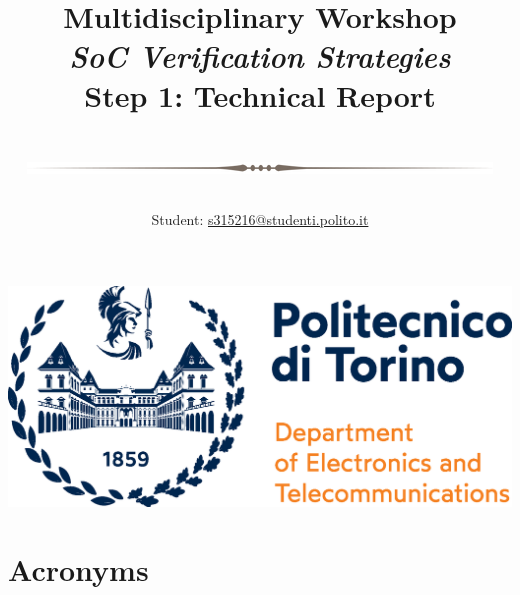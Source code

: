 \documentclass[10pt,  english, makeidx, a4paper, titlepage, oneside]{article}
\title{
    Multidisciplinary Workshop\\
    \textit{SoC Verification Strategies}\\
    \vspace{1cm}
    \textbf{Step 1: Technical Report}\\
    \centerline{\includegraphics[width=0.4\columnwidth]{fig/text-divider.png}}
}
\author{
Student: \href{mailto:s315216@studenti.polito.it}{s315216@studenti.polito.it}
}
\begin{document}
\makeatletter
\begin{titlepage}
    \centerline{\includegraphics[width=0.4\columnwidth]{fig/poli-det-logo.eps}}
    \vfill
    \begin{center}
        {\huge \@title}
    \end{center}

    \vfill

    \begin{flushleft}
        \large
        \@author
    \end{flushleft}
    \vspace{2cm}
    \centerline{\large \@date}
\end{titlepage}
\makeatother

\tableofcontents
\newpage

\listoflistings
\listoffigures
\newpage






\clearpage

\printbibliography

\section*{Acronyms}

\end{document}

